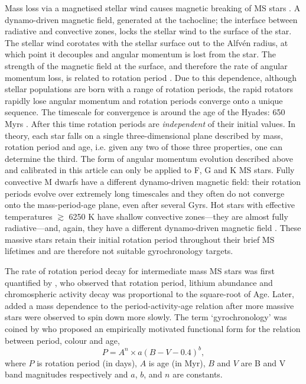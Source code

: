 \documentclass[10pt,preprint]{aastex}
\begin{document}
Mass loss via a magnetised stellar wind causes magnetic breaking of MS stars \citep{Weber1967}.
A dynamo-driven magnetic field, generated at the tachocline; the interface between radiative and convective zones, locks the stellar wind to the surface of the star.
The stellar wind corotates with the stellar surface out to the Alfv\'{e}n radius, at which point it decouples and angular momentum is lost from the star.
The strength of the magnetic field at the surface, and therefore the rate of angular momentum loss, is related to rotation period \citep{Kawaler1988}.
Due to this dependence, although stellar populations are born with a range of rotation periods, the rapid rotators rapidly lose angular momentum and rotation periods converge onto a unique sequence.
The timescale for convergence is around the age of the Hyades: 650 Myrs \citep{Radick1987, Irwin2009}.
After this time rotation periods are \emph{independent} of their initial values.
In theory, each star falls on a single three-dimensional plane described by mass, rotation period and age, i.e. given any two of those three properties, one can determine the third.
The form of angular momentum evolution described above and calibrated in this article can only be applied to F, G and K MS stars.
Fully convective M dwarfs have a different dynamo-driven magnetic field: their rotation periods evolve over extremely long timescales and they often do not converge onto the mass-period-age plane, even after several Gyrs.
Hot stars with effective temperatures $\gtrsim$ 6250 K have shallow convective zones---they are almost fully radiative---and, again, they have a different dynamo-driven magnetic field \citep{Kraft1967}.
These massive stars retain their initial rotation period throughout their brief MS lifetimes and are therefore not suitable gyrochronology targets.

The rate of rotation period decay for intermediate mass MS stars was first quantified by \citet{Skumanich1972}, who observed that rotation period, lithium abundance and chromospheric activity decay was proportional to the square-root of Age.
Later, \citet{Noyes1984_2} added a mass dependence to the period-activity-age relation after more massive stars were observed to spin down more slowly.
The term `gyrochronology' was coined by \citet{Barnes2003} who proposed an empirically motivated functional form for the relation between period, colour and age,
\begin{equation}
P = A^n \times a(B-V-0.4)^b,
\label{eq:Barnes2007_2}
\end{equation}
where $P$ is rotation period (in days), $A$ is age (in Myr), $B$ and $V$ are B and V band magnitudes respectively and $a$, $b$, and $n$ are constants.
\end{document}
